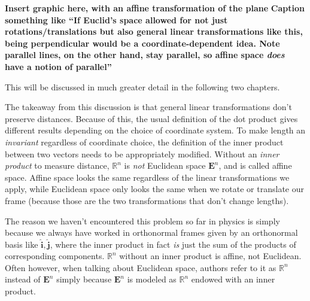 	\textbf{Insert graphic here, with an affine transformation of the plane}
	\textbf{Caption something like ``If Euclid's space allowed for not just rotations/translations but also general linear transformations like this, being perpendicular would be a coordinate-dependent idea. Note parallel lines, on the other hand, stay parallel, so affine space \emph{does} have a notion of parallel''}
	
	This will be discussed in much greater detail in the following two chapters. 
	
	The takeaway from this discussion is that general linear transformations don't preserve distances. Because of this, the usual definition of the dot product gives different results depending on the choice of coordinate system. To make length an \emph{invariant} regardless of coordinate choice, the definition of the inner product between two vectors needs to be appropriately modified. Without an \emph{inner product} to measure distance, $\mathbb{R}^n$ is \emph{not} Euclidean space $\mathbf{E}^n$, and is called affine space. Affine space looks the same regardless of the linear transformations we apply, while Euclidean space only looks the same when we rotate or translate our frame (because those are the two transformations that don't change lengths). 
	
	The reason we haven't encountered this problem so far in physics is simply because we always have worked in orthonormal frames given by an orthonormal basis like $\hat{\mathbf{i}}, \hat{\mathbf{j}}$, where the inner product in fact \emph{is} just the sum of the products of corresponding components. $\mathbb{R}^n$ without an inner product is affine, not Euclidean. Often however, when talking about Euclidean space, authors refer to it as $\mathbb{R}^n$ instead of $\mathbf{E}^n$ simply because $\mathbf{E}^n$ is modeled as $\mathbb{R}^n$ endowed with an inner product.
	
	

